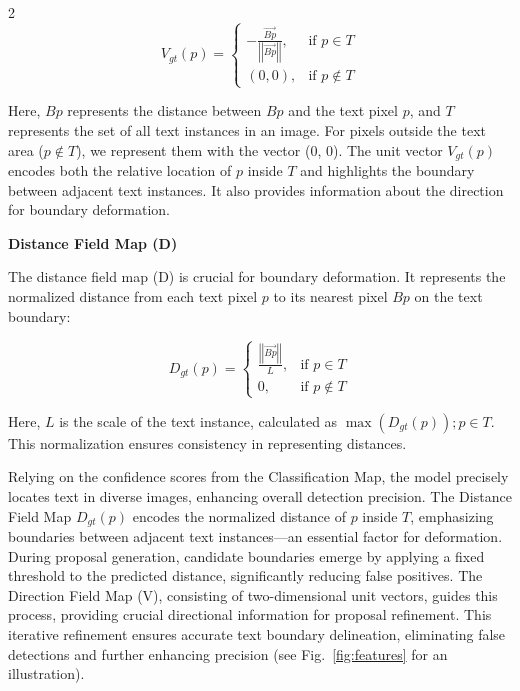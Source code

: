 \documentclass[sn-mathphys,Numbered]{sn-jnl}%
\begin{document}
\begin{multicols}{2}
\begin{equation}
	V_{gt}(p) =
	\begin{cases}
		-\frac{\overrightarrow{Bp}}{\left|\left|\overrightarrow{Bp}\right|\right|}, & \text{if } p \in T \\
		(0, 0), & \text{if } p \notin T
	\end{cases}
\end{equation}

Here, \( Bp \) represents the distance between \( Bp \) and the text pixel \( p \), and \( T \) represents the set of all text instances in an image. For pixels outside the text area (\( p \notin T \)), we represent them with the vector (0, 0). The unit vector \( V_{gt}(p) \) encodes both the relative location of \( p \) inside \( T \) and highlights the boundary between adjacent text instances. It also provides information about the direction for boundary deformation.

\textbf{Distance Field Map (D)}

The distance field map (D) is crucial for boundary deformation. It represents the normalized distance from each text pixel \( p \) to its nearest pixel \( Bp \) on the text boundary:

\begin{equation}
	D_{gt}(p) =
	\begin{cases}
		\frac{\left|\left|\overrightarrow{Bp}\right|\right|}{L}, & \text{if } p \in T \\
		0, & \text{if } p \notin T
	\end{cases}
\end{equation}

Here, \( L \) is the scale of the text instance, calculated as \( \max(D_{gt}(p)); {p \in T} \). This normalization ensures consistency in representing distances.

Relying on the confidence scores from the Classification Map, the model precisely locates text in diverse images, enhancing overall detection precision. The Distance Field Map \( D_{gt}(p) \) encodes the normalized distance of \( p \) inside \( T \), emphasizing boundaries between adjacent text instances—an essential factor for deformation. During proposal generation, candidate boundaries emerge by applying a fixed threshold to the predicted distance, significantly reducing false positives. The Direction Field Map (V), consisting of two-dimensional unit vectors, guides this process, providing crucial directional information for proposal refinement. This iterative refinement ensures accurate text boundary delineation, eliminating false detections and further enhancing precision (see Fig.~\ref{fig:features} for an illustration).


\end{multicols}
\end{document}
